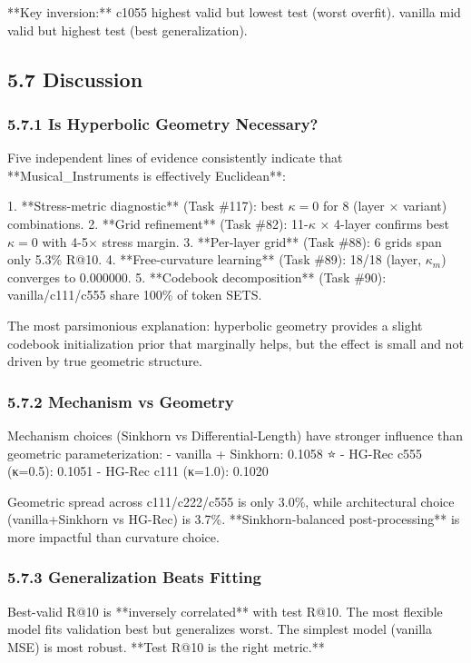 \documentclass[11pt]{article}
\begin{document}
**Key inversion:** c1055 highest valid but lowest test (worst overfit). vanilla mid valid but highest test (best generalization).


\subsection{5.7 Discussion}


\subsubsection{5.7.1 Is Hyperbolic Geometry Necessary?}

Five independent lines of evidence consistently indicate that **Musical\_Instruments is effectively Euclidean**:

1. **Stress-metric diagnostic** (Task \#117): best $\kappa = 0$ for 8 (layer × variant) combinations.
2. **Grid refinement** (Task \#82): 11-$\kappa$ × 4-layer confirms best $\kappa = 0$ with 4-5× stress margin.
3. **Per-layer grid** (Task \#88): 6 grids span only 5.3\% R@10.
4. **Free-curvature learning** (Task \#89): 18/18 (layer, $\kappa_m$) converges to 0.000000.
5. **Codebook decomposition** (Task \#90): vanilla/c111/c555 share 100\% of token SETS.

The most parsimonious explanation: hyperbolic geometry provides a slight codebook initialization prior that marginally helps, but the effect is small and not driven by true geometric structure.


\subsubsection{5.7.2 Mechanism vs Geometry}

Mechanism choices (Sinkhorn vs Differential-Length) have stronger influence than geometric parameterization:
- vanilla + Sinkhorn: 0.1058 ⭐
- HG-Rec c555 (κ=0.5): 0.1051
- HG-Rec c111 (κ=1.0): 0.1020

Geometric spread across c111/c222/c555 is only 3.0\%, while architectural choice (vanilla+Sinkhorn vs HG-Rec) is 3.7\%. **Sinkhorn-balanced post-processing** is more impactful than curvature choice.


\subsubsection{5.7.3 Generalization Beats Fitting}

Best-valid R@10 is **inversely correlated** with test R@10. The most flexible model fits validation best but generalizes worst. The simplest model (vanilla MSE) is most robust. **Test R@10 is the right metric.**
\end{document}
